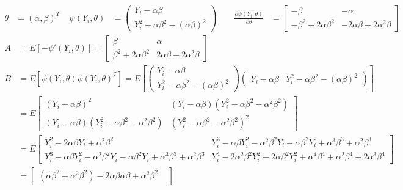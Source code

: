 \documentclass[
  letterpaper,
  DIV=11,
  numbers=noendperiod]{scrreprt}
\begin{document}
\[\begin{aligned}
\theta &= (\alpha, \beta)^T ~~~~~
\psi(Y_i, \theta) &=  \begin{pmatrix} Y_i - \alpha \beta \\ Y_i^2 - \alpha \beta^2 - (\alpha \beta)^2 \end{pmatrix} ~~~~~~~~~
\frac{\partial \psi(Y_i, \theta)}{\partial \theta} &=  \begin{bmatrix} -  \beta & - \alpha \\
- \beta^2 - 2\alpha \beta^2 & - 2\alpha \beta - 2\alpha^2 \beta \end{bmatrix}
\end{aligned}
\] \[ \begin{aligned}
A &= E[- \psi'(Y_i, \theta)] =  \begin{bmatrix}   \beta &  \alpha \\
 \beta^2 + 2\alpha \beta^2 &  2\alpha \beta + 2\alpha^2 \beta \end{bmatrix} \\
B &= E[\psi (Y_i, \theta)\psi (Y_i, \theta)^T] =  E\left[\begin{pmatrix} Y_i - \alpha \beta \\ Y_i^2 - \alpha \beta^2 - (\alpha \beta)^2 \end{pmatrix} \begin{pmatrix} Y_i - \alpha \beta & Y_i^2 - \alpha \beta^2 - (\alpha \beta)^2 \end{pmatrix} \right]\\
&= E\begin{bmatrix} (Y_i -\alpha \beta)^2 & (Y_i -\alpha \beta)(Y_i^2 -\alpha \beta^2 -\alpha^2\beta^2) \\
(Y_i -\alpha \beta)(Y_i^2 -\alpha \beta^2 -\alpha^2\beta^2) & (Y_i^2 -\alpha \beta^2 -\alpha^2\beta^2)^2\end{bmatrix} \\
&= E\begin{bmatrix} Y_i^2 - 2 \alpha \beta Y_i +\alpha^2 \beta^2 &
Y_i^3-\alpha \beta Y_i^2 - \alpha^2 \beta^2 Y_i -\alpha \beta^2 Y_i + \alpha^3 \beta^3 + \alpha^2\beta^3\\
Y_i^3-\alpha \beta Y_i^2 - \alpha^2 \beta^2 Y_i -\alpha \beta^2 Y_i + \alpha^3 \beta^3 + \alpha^2\beta^3 &
Y_i^4 -2 \alpha^2 \beta^2 Y_i^2 - 2 \alpha \beta^2 Y_i^2 + \alpha^4 \beta^4 +\alpha^2 \beta^4 + 2 \alpha^3 \beta^4\end{bmatrix} \\
&= \begin{bmatrix} (\alpha \beta^2 + \alpha^2 \beta^2) - 2 \alpha \beta \alpha \beta  +\alpha^2 \beta^2 &

\end{bmatrix}
\end{aligned}\]
\end{document}
